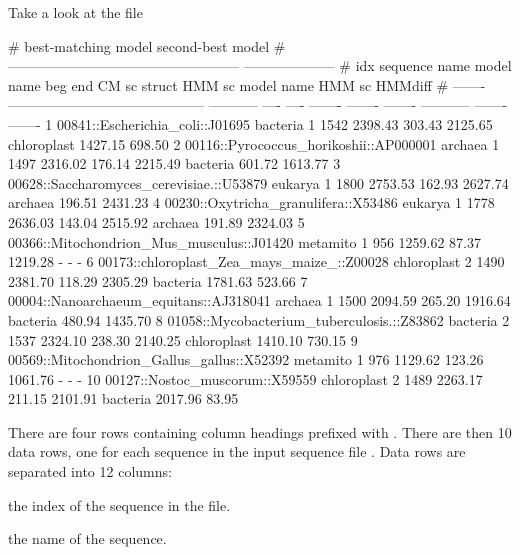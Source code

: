 Take a look at the file 

\begin{sreoutputtinywide}
#                                                                     best-matching model                   second-best model  
#                                                      --------------------------------------------------  --------------------
#     idx  sequence name                               model name    beg   end    CM sc   struct   HMM sc  model name    HMM sc  HMMdiff
# -------  ------------------------------------------  -----------  ----  ----  -------  -------  -------  -----------  -------  -------
        1  00841::Escherichia_coli::J01695             bacteria        1  1542  2398.43   303.43  2125.65  chloroplast  1427.15   698.50
        2  00116::Pyrococcus_horikoshii::AP000001      archaea         1  1497  2316.02   176.14  2215.49  bacteria      601.72  1613.77
        3  00628::Saccharomyces_cerevisiae.::U53879    eukarya         1  1800  2753.53   162.93  2627.74  archaea       196.51  2431.23
        4  00230::Oxytricha_granulifera::X53486        eukarya         1  1778  2636.03   143.04  2515.92  archaea       191.89  2324.03
        5  00366::Mitochondrion_Mus_musculus::J01420   metamito        1   956  1259.62    87.37  1219.28  -                  -        -
        6  00173::chloroplast_Zea_mays_maize_::Z00028  chloroplast     2  1490  2381.70   118.29  2305.29  bacteria     1781.63   523.66
        7  00004::Nanoarchaeum_equitans::AJ318041      archaea         1  1500  2094.59   265.20  1916.64  bacteria      480.94  1435.70
        8  01058::Mycobacterium_tuberculosis.::Z83862  bacteria        2  1537  2324.10   238.30  2140.25  chloroplast  1410.10   730.15
        9  00569::Mitochondrion_Gallus_gallus::X52392  metamito        1   976  1129.62   123.26  1061.76  -                  -        -
       10  00127::Nostoc_muscorum::X59559              chloroplast     2  1489  2263.17   211.15  2101.91  bacteria     2017.96    83.95
\end{sreoutputtinywide}

There are four rows containing column headings prefixed with
\prog{\#}. There are then 10 data rows, one for each sequence in the
input sequence file . Data rows are
separated into 12 columns:

\begin{wideitem}
\item[\emprog{idx}] the index of the sequence in the file.

\item[\emprog{sequence name}] the name of the sequence.
\end{wideitem}


